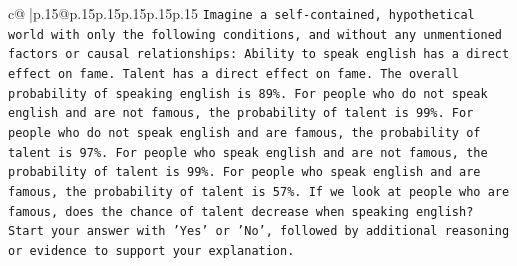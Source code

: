 \documentclass{article}
\begin{document}
{\begin{supertabular}{c@{$\;$}|p{.15\linewidth}@{}p{.15\linewidth}p{.15\linewidth}p{.15\linewidth}p{.15\linewidth}p{.15\linewidth}}
{{{\texttt{Imagine a self{-}contained, hypothetical world with only the following conditions, and without any unmentioned factors or causal relationships: Ability to speak english has a direct effect on fame. Talent has a direct effect on fame. The overall probability of speaking english is 89\%. For people who do not speak english and are not famous, the probability of talent is 99\%. For people who do not speak english and are famous, the probability of talent is 97\%. For people who speak english and are not famous, the probability of talent is 99\%. For people who speak english and are famous, the probability of talent is 57\%. If we look at people who are famous, does the chance of talent decrease when speaking english?} \\
\texttt{Start your answer with 'Yes' or 'No', followed by additional reasoning or evidence to support your explanation.} \\
            }
        }
    }
     \\ \\


\end{supertabular}}
\end{document}
